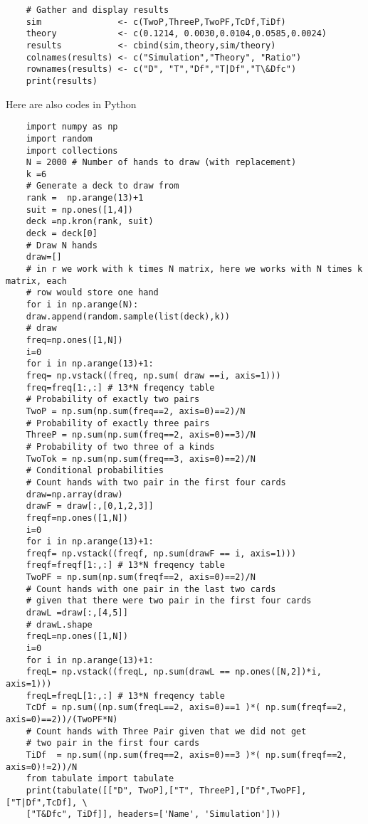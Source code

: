 \begin{exercise}
\begin{verbatim}
	# Gather and display results
	sim               <- c(TwoP,ThreeP,TwoPF,TcDf,TiDf)
	theory            <- c(0.1214, 0.0030,0.0104,0.0585,0.0024)
	results           <- cbind(sim,theory,sim/theory)
	colnames(results) <- c("Simulation","Theory", "Ratio")
	rownames(results) <- c("D", "T","Df","T|Df","T\&Dfc")
	print(results)
\end{verbatim}  
Here are also codes in Python
\begin{verbatim}
	import numpy as np
	import random
	import collections
	N = 2000 # Number of hands to draw (with replacement)
	k =6
	# Generate a deck to draw from
	rank =  np.arange(13)+1  
	suit = np.ones([1,4])
	deck =np.kron(rank, suit)
	deck = deck[0]
	# Draw N hands
	draw=[] 	
	# in r we work with k times N matrix, here we works with N times k matrix, each 
	# row would store one hand
	for i in np.arange(N):
	draw.append(random.sample(list(deck),k))
	# draw
	freq=np.ones([1,N])
	i=0
	for i in np.arange(13)+1: 
	freq= np.vstack((freq, np.sum( draw ==i, axis=1)))
	freq=freq[1:,:] # 13*N freqency table
	# Probability of exactly two pairs
	TwoP = np.sum(np.sum(freq==2, axis=0)==2)/N
	# Probability of exactly three pairs
	ThreeP = np.sum(np.sum(freq==2, axis=0)==3)/N 
	# Probability of two three of a kinds
	TwoTok = np.sum(np.sum(freq==3, axis=0)==2)/N  
	# Conditional probabilities
	# Count hands with two pair in the first four cards
	draw=np.array(draw)
	drawF = draw[:,[0,1,2,3]]
	freqf=np.ones([1,N])
	i=0
	for i in np.arange(13)+1: 
	freqf= np.vstack((freqf, np.sum(drawF == i, axis=1)))
	freqf=freqf[1:,:] # 13*N freqency table
	TwoPF = np.sum(np.sum(freqf==2, axis=0)==2)/N  
	# Count hands with one pair in the last two cards 
	# given that there were two pair in the first four cards
	drawL =draw[:,[4,5]]
	# drawL.shape
	freqL=np.ones([1,N])
	i=0
	for i in np.arange(13)+1: 
	freqL= np.vstack((freqL, np.sum(drawL == np.ones([N,2])*i, axis=1)))
	freqL=freqL[1:,:] # 13*N freqency table
	TcDf = np.sum((np.sum(freqL==2, axis=0)==1 )*( np.sum(freqf==2, axis=0)==2))/(TwoPF*N) 
	# Count hands with Three Pair given that we did not get
	# two pair in the first four cards
	TiDf  = np.sum((np.sum(freq==2, axis=0)==3 )*( np.sum(freqf==2, axis=0)!=2))/N
	from tabulate import tabulate
	print(tabulate([["D", TwoP],["T", ThreeP],["Df",TwoPF],["T|Df",TcDf], \
	["T&Dfc", TiDf]], headers=['Name', 'Simulation']))
\end{verbatim}


\end{exercise}
